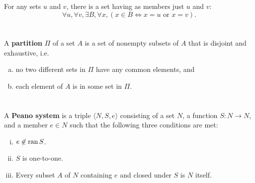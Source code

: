 \documentclass{report}
\begin{document}

\section{}%

  For any sets $u$ and $v$, there is a set having as members just $u$ and $v$:
    $$\forall u, \forall v, \exists B, \forall x,
        (x \in B \iff x = u \text{ or } x = v).$$



\section{}%

  A \textbf{partition} $\Pi$ of a set $A$ is a set of nonempty subsets of $A$
    that is disjoint and exhaustive, i.e.
    \begin{enumerate}[(a)]
      \item no two different sets in $\Pi$ have any common elements, and
      \item each element of $A$ is in some set in $\Pi$.
    \end{enumerate}


\section{}%

  A \textbf{Peano system} is a triple $\langle N, S, e \rangle$ consisting of a
    set $N$, a function $S \colon N \rightarrow N$, and a member $e \in N$ such
    that the following three conditions are met:
  \begin{enumerate}[(i)]
    \item $e \not\in \mathop{\text{ran}}{S}$.
    \item $S$ is one-to-one.
    \item Every subset $A$ of $N$ containing $e$ and closed under $S$ is $N$
      itself.
  \end{enumerate}


\section{}%
\end{document}
